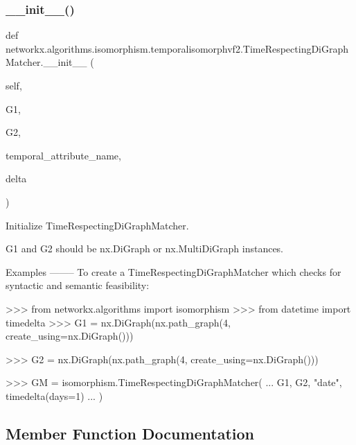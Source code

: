 \subsubsection{\texorpdfstring{\+\_\+\+\_\+init\+\_\+\+\_\+()}{\_\_init\_\_()}}
{\footnotesize\ttfamily def networkx.\+algorithms.\+isomorphism.\+temporalisomorphvf2.\+Time\+Respecting\+Di\+Graph\+Matcher.\+\_\+\+\_\+init\+\_\+\+\_\+ (\begin{DoxyParamCaption}\item[{}]{self,  }\item[{}]{G1,  }\item[{}]{G2,  }\item[{}]{temporal\+\_\+attribute\+\_\+name,  }\item[{}]{delta }\end{DoxyParamCaption})}

\begin{DoxyVerb}Initialize TimeRespectingDiGraphMatcher.

G1 and G2 should be nx.DiGraph or nx.MultiDiGraph instances.

Examples
--------
To create a TimeRespectingDiGraphMatcher which checks for
syntactic and semantic feasibility:

>>> from networkx.algorithms import isomorphism
>>> from datetime import timedelta
>>> G1 = nx.DiGraph(nx.path_graph(4, create_using=nx.DiGraph()))

>>> G2 = nx.DiGraph(nx.path_graph(4, create_using=nx.DiGraph()))

>>> GM = isomorphism.TimeRespectingDiGraphMatcher(
...     G1, G2, "date", timedelta(days=1)
... )
\end{DoxyVerb}
 

\subsection{Member Function Documentation}
\mbox{\label{classnetworkx_1_1algorithms_1_1isomorphism_1_1temporalisomorphvf2_1_1TimeRespectingDiGraphMatcher_a1d90a92d362e37f0f49f5fb22ebea15f}} 

